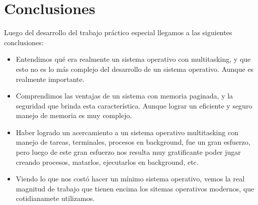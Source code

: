 \documentclass[a4paper,10pt]{article}
\begin{document}
\newpage
\section{Conclusiones}
Luego del desarrollo del trabajo práctico especial llegamos a las siguientes conclusiones:
\begin{itemize}
 \item Entendimos qué era realmente un sistema operativo con multitasking, y que esto no es lo más complejo del 
    desarrollo de un sistema operativo. Aunque es realmente importante.
 \item Comprendimos las ventajas de un sistema con memoria paginada, y la seguridad que brinda esta característica. Aunque
    lograr un eficiente y seguro manejo de memoria es muy complejo.
 \item Haber logrado un acercamiento a un sistema operativo multitasking con manejo de tareas, terminales, procesos en background, fue un gran
      esfuerzo, pero luego de este gran esfuerzo nos resulta muy gratificante poder jugar creando procesos, matarlos, ejecutarlos en background, etc.
 \item Viendo lo que nos costó hacer un mínimo sistema operativo, vemos la real magnitud de trabajo que tienen encima los sitemas operativos modernos,
      que cotidianamete utilizamos.
\end{itemize}

\bigskip
\end{document}
